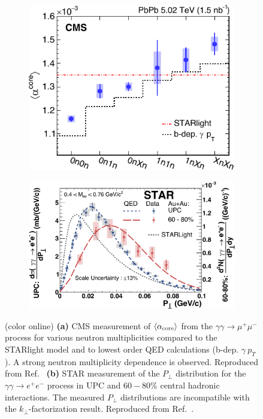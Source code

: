 \documentclass[twocolumn,epjc3]{svjour3}\sloppy
\begin{document}
\begin{figure}
    \centering
    \begin{subfigure}{.43\textwidth}
      \centering
      \includegraphics[width=.99\linewidth]{fig/fig_1-crop.pdf}
      \caption{}
    \end{subfigure}%
    \begin{subfigure}{.57\textwidth}
      \centering
      \includegraphics[width=.99\linewidth]{fig/fig_2-crop.pdf}
      \caption{}
    \end{subfigure}
 
    \caption{ (color online) \textbf{(a)} CMS measurement of $\langle \alpha_{\rm core} \rangle$ from the $\gamma\gamma \rightarrow \mu^+\mu^-$ process for various neutron multiplicities compared to the STARlight model and to lowest order QED calculations (b-dep. $\gamma\ p_T$). A strong neutron multiplicity dependence is observed. Reproduced from Ref.~\cite{cmscollaborationObservationForwardNeutron2020a}
    \textbf{(b)} STAR measurement of the $P_\perp$ distribution for the $\gamma\gamma \rightarrow e^+e^-$ process in UPC and $60-80\%$ central hadronic interactions. The measured $P_\perp$ distributions are incompatible with the $k_\perp$-factorization result. Reproduced from Ref.~\cite{starcollaborationMeasurementMomentumAngular2021}.
    }
    \label{fig:exp_impact}
\end{figure}
\end{document}
